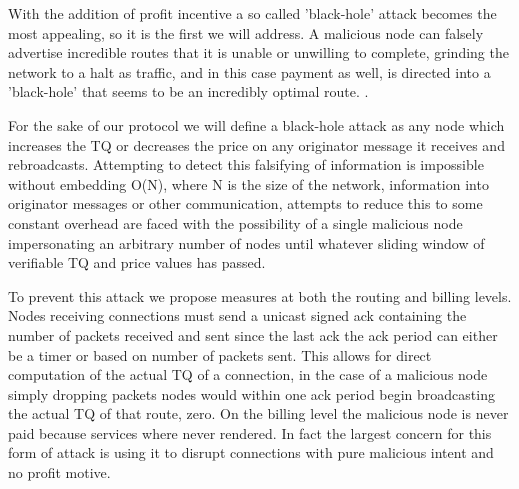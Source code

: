 \documentclass[11pt]{article}
\begin{document}
               With the addition of profit incentive a so called 'black-hole' attack becomes the most appealing, so it is the first we will address. A malicious node can falsely advertise incredible routes that it is unable or unwilling to complete, grinding the network to a halt as traffic, and in this case payment as well, is directed into a 'black-hole' that seems to be an incredibly optimal route. \cite{routesec}. 
               
               For the sake of our protocol we will define a black-hole attack as any node which increases the TQ or decreases the price on any originator message it receives and rebroadcasts. Attempting to detect this falsifying of information is impossible without embedding O(N), where N is the size of the network, information into originator messages or other communication, attempts to reduce this to some constant overhead are faced with the possibility of a single malicious node impersonating an arbitrary number of nodes until whatever sliding window of verifiable TQ and price values has passed.
               
               To prevent this attack we propose measures at both the routing and billing levels. Nodes receiving connections must send a unicast signed ack containing the number of packets received and sent since the last ack the ack period can either be a timer or based on number of packets sent. This allows for direct computation of the actual TQ of a connection, in the case of a malicious node simply dropping packets nodes would within one ack period begin broadcasting the actual TQ of that route, zero. On the billing level the malicious node is never paid because services where never rendered. In fact the largest concern for this form of attack is using it to disrupt connections with pure malicious intent and no profit motive.
               
\end{document}
